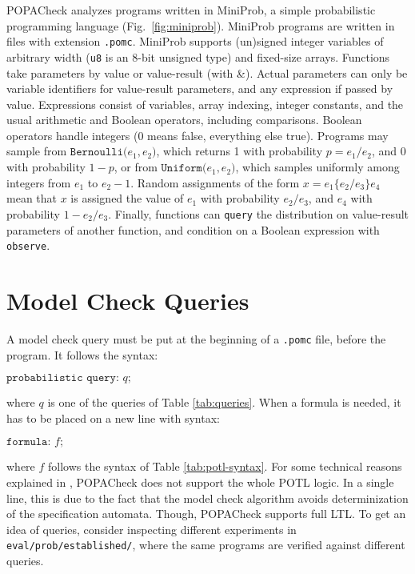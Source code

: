 \documentclass[9pt,a4paper]{article}
\begin{document}
POPACheck analyzes programs written in MiniProb, a simple probabilistic programming language (Fig.~\ref{fig:miniprob}). MiniProb programs are written in files with extension \verb|.pomc|.
MiniProb supports (un)signed integer variables of arbitrary width
(\texttt{u8} is an 8-bit unsigned type) and fixed-size arrays.
Functions take parameters by value or value-result (with \&).
Actual parameters can only be variable identifiers for value-result parameters,
and any expression if passed by value.
Expressions consist of variables, array indexing, integer constants, and the usual arithmetic and Boolean operators, including comparisons.
Boolean operators handle integers (0 means false, everything else true).
Programs may sample from $\texttt{Bernoulli(} e_1, e_2 \texttt{)}$,
which returns 1 with probability $p = e_1 / e_2$, and 0 with probability $1-p$,
or from $\texttt{Uniform(} e_1, e_2 \texttt{)}$,
which samples uniformly among integers from $e_1$ to $e_2 - 1$.
Random assignments of the form $x = e_1 \{ e_2 / e_3 \} e_4$ mean that $x$ is assigned
the value of $e_1$ with probability $e_2 / e_3$, and $e_4$ with probability $1 - e_2 / e_3$.
Finally, functions can \texttt{query} the distribution on value-result parameters of another function, and condition on a Boolean expression with \texttt{observe}.

\section{Model Check Queries}
\label{sec:queries}
A model check query must be put at the beginning of a \verb|.pomc| file, before the program. It follows the syntax: 
\begin{center}
    $\texttt{probabilistic query:} \, \, q \texttt{;}$
\end{center}
where $q$ is one of the queries of Table \ref{tab:queries}. When a formula is needed, it has to be placed on a new line with syntax:
\begin{center}
    $\texttt{formula:} \, \, f \texttt{;}$
\end{center}
where $f$ follows the syntax of Table \ref{tab:potl-syntax}. For some technical reasons explained in \cite{abs-2404-03515}, POPACheck does not support the whole POTL logic. In a single line, this is due to the fact that the model check algorithm avoids determinization of the specification automata. Though, POPACheck supports full LTL. To get an idea of queries, consider inspecting different experiments in \verb|eval/prob/established/|, where the same programs are verified against different queries.
\end{document}
